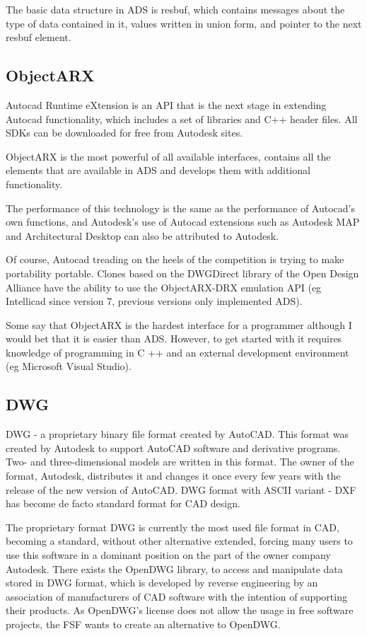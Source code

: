 \documentclass[a4paper, 11pt, article]{report}
\begin{document}
The basic data structure in ADS is resbuf, which contains messages about the type of data contained in it, values written in union form, and pointer to the next resbuf element.
 
\subsection{ObjectARX}

Autocad Runtime eXtension is an API that is the next stage in extending Autocad functionality, which includes a set of libraries and C++ header files. All SDKs can be downloaded for free from Autodesk sites.

ObjectARX is the most powerful of all available interfaces, contains all the elements that are available in ADS and develops them with additional functionality.

The performance of this technology is the same as the performance of Autocad's own functions, and Autodesk's use of Autocad extensions such as Autodesk MAP and Architectural Desktop can also be attributed to Autodesk.

Of course, Autocad treading on the heels of the competition is trying to make portability portable. Clones based on the DWGDirect library of the Open Design Alliance have the ability to use the ObjectARX-DRX emulation API (eg Intellicad since version 7, previous versions only implemented ADS).

Some say that ObjectARX is the hardest interface for a programmer although I would bet that it is easier than ADS. However, to get started with it requires knowledge of programming in C ++ and an external development environment (eg Microsoft Visual Studio).

\subsection{DWG}
   
DWG - a proprietary binary file format created by AutoCAD.
This format was created by Autodesk to support AutoCAD software and derivative programs. Two- and three-dimensional models are written in this format. The owner of the format, Autodesk, distributes it and changes it once every few years with the release of the new version of AutoCAD.
DWG format with ASCII variant - DXF has become de facto standard format for CAD design.

The proprietary format DWG is currently the most used file format in CAD, becoming a standard, without other alternative extended, forcing many users to use this software in a dominant position on the part of the owner company Autodesk.
There exists the OpenDWG library, to access and manipulate data stored in DWG format, which is developed by reverse engineering by an association of manufacturers of CAD software with the intention of supporting their products. As OpenDWG's license does not allow the usage in free software projects, the FSF wants to create an alternative to OpenDWG.
\end{document}
